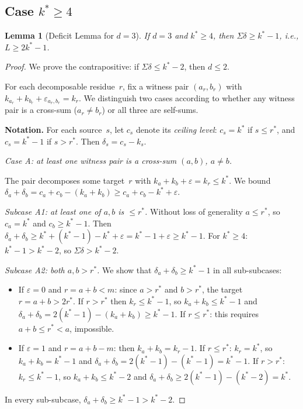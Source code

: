 \documentclass[11pt]{amsart}
\newtheorem{lemma}[theorem]{Lemma}
\theoremstyle{definition}
\theoremstyle{remark}
\begin{document}
\subsection{Case $k^* \ge 4$}

\begin{lemma}[Deficit Lemma for $d = 3$]\label{lem:deficit-d3}
If $d = 3$ and $k^* \ge 4$, then $\Sigma\delta \ge k^* - 1$,
i.e., $L \ge 2k^* - 1$.
\end{lemma}

\begin{proof}
We prove the contrapositive: if $\Sigma\delta \le k^* - 2$, then $d \le 2$.

For each decomposable residue~$r$, fix a witness pair $(a_r, b_r)$
with $k_{a_r} + k_{b_r} + \varepsilon_{a_r, b_r} = k_r$.
We distinguish two cases according to whether any witness pair is a
cross-sum ($a_r \ne b_r$) or all three are self-sums.

\medskip
\textbf{Notation.}
For each source~$s$, let $c_s$ denote its \emph{ceiling level}:
$c_s = k^*$ if $s \le r^*$, and $c_s = k^* - 1$ if $s > r^*$.
Then $\delta_s = c_s - k_s$.

\medskip
\emph{Case A: at least one witness pair is a cross-sum $(a, b)$, $a \ne b$.}

The pair decomposes some target~$r$ with $k_a + k_b + \varepsilon = k_r \le k^*$.
We bound $\delta_a + \delta_b = c_a + c_b - (k_a + k_b) \ge c_a + c_b - k^* + \varepsilon$.

\emph{Subcase A1: at least one of $a, b$ is $\le r^*$.}
Without loss of generality $a \le r^*$, so $c_a = k^*$ and $c_b \ge k^* - 1$.
Then $\delta_a + \delta_b \ge k^* + (k^* - 1) - k^* + \varepsilon = k^* - 1 + \varepsilon \ge k^* - 1$.
For $k^* \ge 4$: $k^* - 1 > k^* - 2$, so $\Sigma\delta > k^* - 2$.

\emph{Subcase A2: both $a, b > r^*$.}
We show that $\delta_a + \delta_b \ge k^* - 1$ in all sub-subcases:
\begin{itemize}
\item If $\varepsilon = 0$ and $r = a + b < m$: since $a > r^*$ and $b > r^*$,
  the target $r = a + b > 2r^*$.  If $r > r^*$ then $k_r \le k^* - 1$,
  so $k_a + k_b \le k^* - 1$ and
  $\delta_a + \delta_b = 2(k^*-1) - (k_a+k_b) \ge k^* - 1$.
  If $r \le r^*$: this requires $a + b \le r^* < a$, impossible.
\item If $\varepsilon = 1$ and $r = a + b - m$: then $k_a + k_b = k_r - 1$.
  If $r \le r^*$: $k_r = k^*$, so $k_a + k_b = k^* - 1$ and
  $\delta_a + \delta_b = 2(k^*-1) - (k^*-1) = k^* - 1$.
  If $r > r^*$: $k_r \le k^* - 1$, so $k_a + k_b \le k^* - 2$ and
  $\delta_a + \delta_b \ge 2(k^*-1) - (k^*-2) = k^*$.
\end{itemize}
In every sub-subcase, $\delta_a + \delta_b \ge k^* - 1 > k^* - 2$.


\end{proof}
\end{document}
